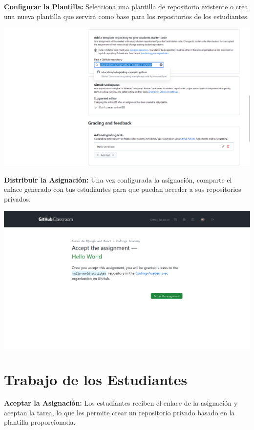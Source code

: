 \documentclass[
  a4paper,
  DIV=11,
  numbers=noendperiod,
  onepage,
  openany]{scrreprt}
\begin{document}
\textbf{Configurar la Plantilla:} Selecciona una plantilla de
repositorio existente o crea una nueva plantilla que servirá como base
para los repositorios de los estudiantes.

\begin{center}
\includegraphics{unidades/unidad1/images/paste-3.png}
\end{center}

\textbf{Distribuir la Asignación:} Una vez configurada la asignación,
comparte el enlace generado con tus estudiantes para que puedan acceder
a sus repositorios privados.

\begin{center}
\includegraphics{unidades/unidad1/images/paste-4.png}
\end{center}

\section{Trabajo de los Estudiantes
🧑‍💻}\label{trabajo-de-los-estudiantes}

\textbf{Aceptar la Asignación:} Los estudiantes reciben el enlace de la
asignación y aceptan la tarea, lo que les permite crear un repositorio
privado basado en la plantilla proporcionada.
\end{document}
